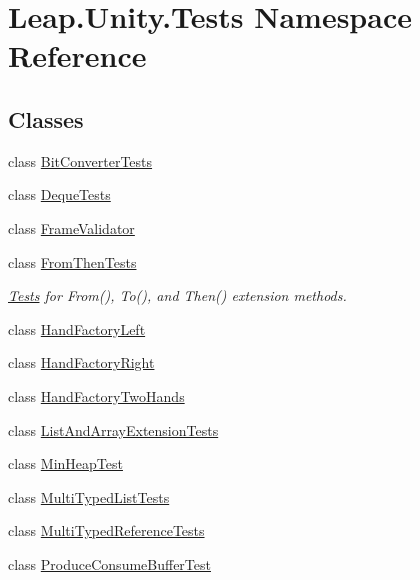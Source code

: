 \hypertarget{namespace_leap_1_1_unity_1_1_tests}{}\section{Leap.\+Unity.\+Tests Namespace Reference}
\label{namespace_leap_1_1_unity_1_1_tests}
\subsection*{Classes}
\begin{DoxyCompactItemize}
\item 
class \mbox{\hyperlink{class_leap_1_1_unity_1_1_tests_1_1_bit_converter_tests}{Bit\+Converter\+Tests}}
\item 
class \mbox{\hyperlink{class_leap_1_1_unity_1_1_tests_1_1_deque_tests}{Deque\+Tests}}
\item 
class \mbox{\hyperlink{class_leap_1_1_unity_1_1_tests_1_1_frame_validator}{Frame\+Validator}}
\item 
class \mbox{\hyperlink{class_leap_1_1_unity_1_1_tests_1_1_from_then_tests}{From\+Then\+Tests}}
\begin{DoxyCompactList}\small\item\em \mbox{\hyperlink{namespace_leap_1_1_unity_1_1_tests}{Tests}} for From(), To(), and Then() extension methods. \end{DoxyCompactList}\item 
class \mbox{\hyperlink{class_leap_1_1_unity_1_1_tests_1_1_hand_factory_left}{Hand\+Factory\+Left}}
\item 
class \mbox{\hyperlink{class_leap_1_1_unity_1_1_tests_1_1_hand_factory_right}{Hand\+Factory\+Right}}
\item 
class \mbox{\hyperlink{class_leap_1_1_unity_1_1_tests_1_1_hand_factory_two_hands}{Hand\+Factory\+Two\+Hands}}
\item 
class \mbox{\hyperlink{class_leap_1_1_unity_1_1_tests_1_1_list_and_array_extension_tests}{List\+And\+Array\+Extension\+Tests}}
\item 
class \mbox{\hyperlink{class_leap_1_1_unity_1_1_tests_1_1_min_heap_test}{Min\+Heap\+Test}}
\item 
class \mbox{\hyperlink{class_leap_1_1_unity_1_1_tests_1_1_multi_typed_list_tests}{Multi\+Typed\+List\+Tests}}
\item 
class \mbox{\hyperlink{class_leap_1_1_unity_1_1_tests_1_1_multi_typed_reference_tests}{Multi\+Typed\+Reference\+Tests}}
\item 
class \mbox{\hyperlink{class_leap_1_1_unity_1_1_tests_1_1_produce_consume_buffer_test}{Produce\+Consume\+Buffer\+Test}}

\end{DoxyCompactItemize}
